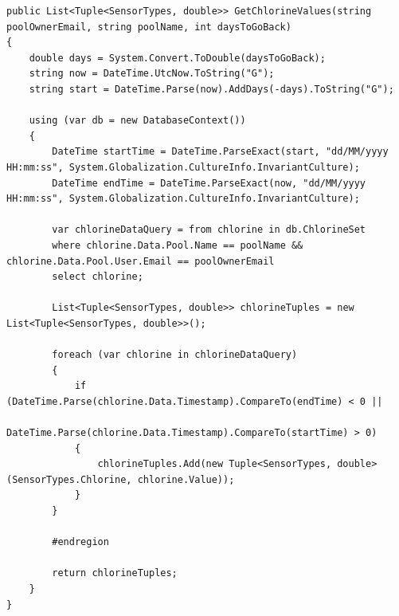 \begin{lstlisting}
public List<Tuple<SensorTypes, double>> GetChlorineValues(string poolOwnerEmail, string poolName, int daysToGoBack)
{
	double days = System.Convert.ToDouble(daysToGoBack);
	string now = DateTime.UtcNow.ToString("G");
	string start = DateTime.Parse(now).AddDays(-days).ToString("G");
	
	using (var db = new DatabaseContext())
	{
		DateTime startTime = DateTime.ParseExact(start, "dd/MM/yyyy HH:mm:ss", System.Globalization.CultureInfo.InvariantCulture);
		DateTime endTime = DateTime.ParseExact(now, "dd/MM/yyyy HH:mm:ss", System.Globalization.CultureInfo.InvariantCulture);
	
		var chlorineDataQuery = from chlorine in db.ChlorineSet
		where chlorine.Data.Pool.Name == poolName && chlorine.Data.Pool.User.Email == poolOwnerEmail
		select chlorine;
		
		List<Tuple<SensorTypes, double>> chlorineTuples = new List<Tuple<SensorTypes, double>>();
		
		foreach (var chlorine in chlorineDataQuery)
		{
			if (DateTime.Parse(chlorine.Data.Timestamp).CompareTo(endTime) < 0 ||
			DateTime.Parse(chlorine.Data.Timestamp).CompareTo(startTime) > 0)
			{
				chlorineTuples.Add(new Tuple<SensorTypes, double>(SensorTypes.Chlorine, chlorine.Value));
			}
		}
		
		#endregion
		
		return chlorineTuples;
	}
}
\end{lstlisting}





